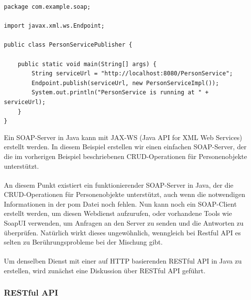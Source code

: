 \noindent\begin{minipage}{\textwidth}
\begin{lstlisting}[caption={SOAP Person Service Publisher},captionpos=b,label={lst:soap_person_publish}]
package com.example.soap;

import javax.xml.ws.Endpoint;

public class PersonServicePublisher {

    public static void main(String[] args) {
        String serviceUrl = "http://localhost:8080/PersonService";
        Endpoint.publish(serviceUrl, new PersonServiceImpl());
        System.out.println("PersonService is running at " + serviceUrl);
    }
}
\end{lstlisting}
\end{minipage}
Ein SOAP-Server in Java kann mit JAX-WS (Java API for XML Web Services) erstellt werden. In diesem Beispiel erstellen wir einen einfachen SOAP-Server, der die im vorherigen Beispiel beschriebenen CRUD-Operationen für Personenobjekte unterstützt.\\\\
An diesem Punkt existiert ein funktionierender SOAP-Server in Java, der die CRUD-Operationen für Personenobjekte unterstützt, auch wenn die notwendigen Informationen in der pom Datei noch fehlen. Nun kann noch ein SOAP-Client erstellt werden, um diesen Webdienst aufzurufen, oder vorhandene Tools wie SoapUI verwenden, um Anfragen an den Server zu senden und die Antworten zu überprüfen. Natürlich wirkt dieses ungewöhnlich, wenngleich bei Restful API es selten zu Berührungsprobleme bei der Mischung gibt. 
\\\\
Um denselben Dienst mit einer auf HTTP basierenden RESTful API in Java zu erstellen, wird zunächst eine Diskussion über RESTful API geführt. 

\subsubsection{RESTful API}

